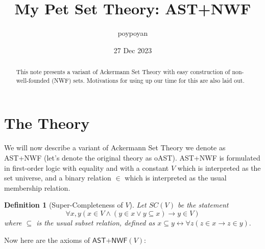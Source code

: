 \documentclass{article}
\title{My Pet Set Theory: \textsf{AST+NWF}}
\author{poypoyan}
\date{27 Dec 2023}   %
\newtheorem{definition}{Definition}[section]
\begin{document}
\maketitle

\begin{abstract}
This note presents a variant of Ackermann Set Theory with easy construction of non-well-founded (NWF) sets. Motivations for using up our time for this are also laid out.
\end{abstract}

\section{The Theory}
We will now describe a variant of Ackermann Set Theory \cite{ackermann} we denote as \textsf{AST+NWF} (let's denote the original theory as \textsf{oAST}). \textsf{AST+NWF} is formulated in first-order logic with equality and with a constant $V$ which is interpreted as the set universe, and a binary relation $\in$ which is interpreted as the usual membership relation.

\begin{definition}[Super-Completeness of $V$]
Let $SC(V)$ be the statement $$\forall x, y (x \in V \wedge (y \in x \vee y \subseteq x) \rightarrow y \in V)$$ where $\subseteq$ is the usual subset relation, defined as $x \subseteq y \leftrightarrow \forall z(z \in x \rightarrow z \in y).$
\end{definition}

\noindent Now here are the axioms of $\textsf{AST+NWF}(V)$:
\end{document}
